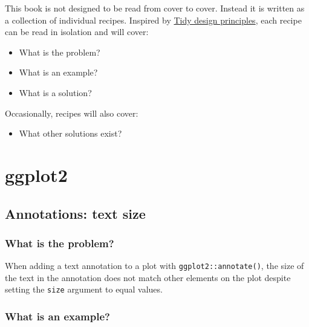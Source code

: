 \documentclass[
  letterpaper,
  DIV=11,
  numbers=noendperiod]{scrreprt}
\providecommand{\tightlist}{%
  \setlength{\itemsep}{0pt}\setlength{\parskip}{0pt}}\usepackage{longtable,booktabs,array}
\begin{document}

This book is not designed to be read from cover to cover. Instead it is
written as a collection of individual recipes. Inspired by
\href{https://design.tidyverse.org/}{Tidy design principles}, each
recipe can be read in isolation and will cover:

\begin{itemize}
\item
  What is the problem?
\item
  What is an example?
\item
  What is a solution?
\end{itemize}

Occasionally, recipes will also cover:

\begin{itemize}
\tightlist
\item
  What other solutions exist?
\end{itemize}

\part{ggplot2}

\chapter{Annotations: text size}\label{annotations-text-size}

\section{What is the problem?}\label{what-is-the-problem}

When adding a text annotation to a plot with
\texttt{ggplot2::annotate()}, the size of the text in the annotation
does not match other elements on the plot despite setting the
\texttt{size} argument to equal values.

\section{What is an example?}\label{what-is-an-example}
\end{document}
